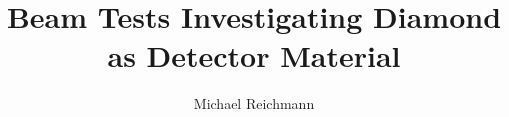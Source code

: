\graphicspath{ {Pics/} }
\makeatletter
{}
\makeatother
{}
\beamertemplatenavigationsymbolsempty
\makeindex
\title[Diamond Beam Tests]{Beam Tests Investigating Diamond as Detector Material}
\author[M. Reichmann]{Michael Reichmann}
\AtBeginSection{\frame{\sectionpage}}